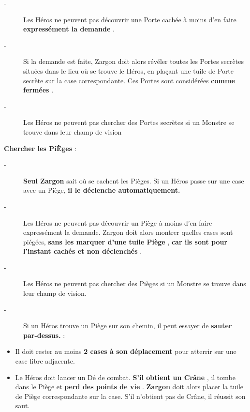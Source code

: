 \documentclass{scrartcl}%
\begin{document}
%
\begin{description}%
\item[{-} ]%
%
 Les Héros ne peuvent pas découvrir une Porte cachée à moins d'en faire %
\textcolor{mygreen}{%
\textbf{expressément la demande}%
}%
.
%
\item[{-} ]%
%
 Si la demande est faite, Zargon doit alors révéler toutes les Portes secrètes situées dans le lieu où se trouve le Héros, en plaçant une tuile de Porte secrète sur la case correspondante. Ces Portes sont considérées %
\textcolor{mygreen}{%
\textbf{comme fermées}%
}%
.
%
\item[{-} ]%
%
 Les Héros ne peuvent pas chercher des Portes secrètes si un Monstre se trouve dans leur champ de vision
%
\end{description}%
\textcolor{mygreen}{%
\textbf{Chercher les PiÈges}%
}%
:
%
\begin{description}%
\item[{-} ]%
%
\textcolor{mygreen}{%
\textbf{Seul Zargon}%
}%
\textit{ }%
 sait où se cachent les Pièges. Si un Héros passe sur une case avec un Piège,%
\textcolor{mygreen}{%
\textbf{ il le déclenche automatiquement.}%
}%

%
\item[{-} ]%
%
 Les Héros ne peuvent pas découvrir un Piège à moins d'en faire expressément la demande. Zargon doit alors montrer quelles cases sont piégées,%
\textcolor{mygreen}{%
\textbf{ sans les marquer d'une tuile Piège}%
}%
, %
\textcolor{mygreen}{%
\textbf{car ils sont pour l'instant cachés et non déclenchés}%
}%
.
%
\item[{-} ]%
%
 Les Héros ne peuvent pas chercher des Pièges si un Monstre se trouve dans leur champ de vision.
%
\item[{-} ]%
%
 Si un Héros trouve un Piège sur son chemin, il peut essayer de %
\textcolor{mygreen}{%
\textbf{sauter par{-}dessus.}%
}%
\textit{ }%
 :
%
\end{description}%
\begin{itemize}%
\item%
%
 Il doit rester au moins%
\textcolor{mygreen}{%
\textbf{ 2 cases à son déplacement }%
}%
pour atterrir sur une case libre adjacente.
%
\item%
%
 Le Héros doit lancer un Dé de combat. %
\textcolor{mygreen}{%
\textbf{S'il obtient un Crâne}%
}%
, il tombe dans le Piège et %
\textcolor{mygreen}{%
\textbf{perd des points de vie}%
}%
. %
\textcolor{mygreen}{%
\textbf{Zargon}%
}%
\textit{ }%
 doit alors placer la tuile de Piège correspondante sur la case. S'il n'obtient pas de Crâne, il réussit son saut.
%
\end{itemize}%
\end{document}
